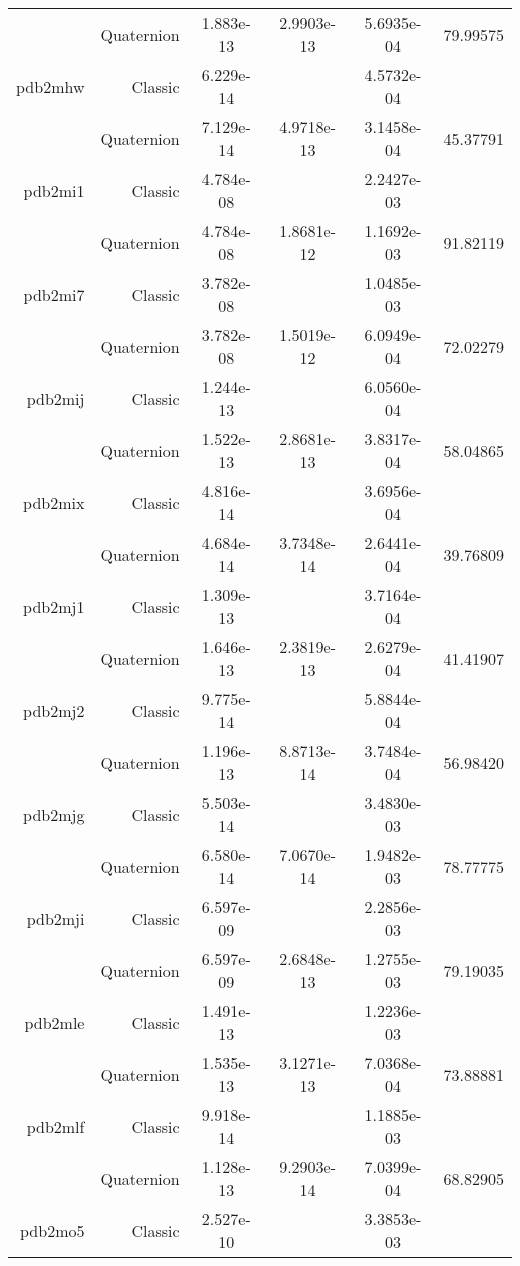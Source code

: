 \begin{xltabular}{\textwidth}{r|rS[table-format=1.3e+2]S[table-format=1.4e+2]S[table-format=1.4e+2]S[table-format=-1.5]}
& Quaternion & 1.883e-13 & 2.9903e-13 & 5.6935e-04 & 79.99575\\  \addlinespace
pdb2mhw & Classic & 6.229e-14 &  & 4.5732e-04 & \\
& Quaternion & 7.129e-14 & 4.9718e-13 & 3.1458e-04 & 45.37791\\  \addlinespace
pdb2mi1 & Classic & 4.784e-08 &  & 2.2427e-03 & \\
& Quaternion & 4.784e-08 & 1.8681e-12 & 1.1692e-03 & 91.82119\\  \addlinespace
pdb2mi7 & Classic & 3.782e-08 &  & 1.0485e-03 & \\
& Quaternion & 3.782e-08 & 1.5019e-12 & 6.0949e-04 & 72.02279\\  \addlinespace
pdb2mij & Classic & 1.244e-13 &  & 6.0560e-04 & \\
& Quaternion & 1.522e-13 & 2.8681e-13 & 3.8317e-04 & 58.04865\\  \addlinespace
pdb2mix & Classic & 4.816e-14 &  & 3.6956e-04 & \\
& Quaternion & 4.684e-14 & 3.7348e-14 & 2.6441e-04 & 39.76809\\  \addlinespace
pdb2mj1 & Classic & 1.309e-13 &  & 3.7164e-04 & \\
& Quaternion & 1.646e-13 & 2.3819e-13 & 2.6279e-04 & 41.41907\\  \addlinespace
pdb2mj2 & Classic & 9.775e-14 &  & 5.8844e-04 & \\
& Quaternion & 1.196e-13 & 8.8713e-14 & 3.7484e-04 & 56.98420\\  \addlinespace
pdb2mjg & Classic & 5.503e-14 &  & 3.4830e-03 & \\
& Quaternion & 6.580e-14 & 7.0670e-14 & 1.9482e-03 & 78.77775\\  \addlinespace
pdb2mji & Classic & 6.597e-09 &  & 2.2856e-03 & \\
& Quaternion & 6.597e-09 & 2.6848e-13 & 1.2755e-03 & 79.19035\\  \addlinespace
pdb2mle & Classic & 1.491e-13 &  & 1.2236e-03 & \\
& Quaternion & 1.535e-13 & 3.1271e-13 & 7.0368e-04 & 73.88881\\  \addlinespace
pdb2mlf & Classic & 9.918e-14 &  & 1.1885e-03 & \\
& Quaternion & 1.128e-13 & 9.2903e-14 & 7.0399e-04 & 68.82905\\  \addlinespace
pdb2mo5 & Classic & 2.527e-10 &  & 3.3853e-03 & \\

\end{xltabular}
